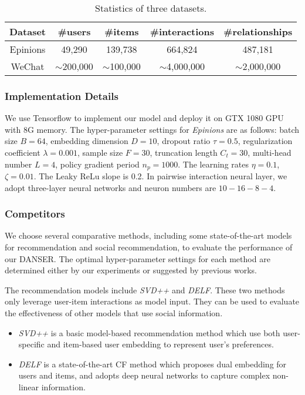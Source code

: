 \documentclass[sigconf]{acmart}
\begin{document}
\begin{table}[h]
\setlength{\abovecaptionskip}{-0.5pt}
\setlength{\belowcaptionskip}{-5pt}
	\centering
	\small
	\caption{Statistics of three datasets.}
    \label{table-dataset}
	\begin{tabular}{ccccc}
		\toprule
		Dataset & \#users & \#items & \#interactions &\#relationships \\
		\midrule
		Epinions &49,290  & 139,738  & 664,824 &487,181    \\
		WeChat &$\sim$200,000  &$\sim$100,000  & $\sim$4,000,000 & $\sim$2,000,000   \\
		\bottomrule
	\end{tabular}
	\vspace{-15pt}
\end{table}

\subsubsection{Implementation Details}

We use Tensorflow to implement our model and deploy it on GTX 1080 GPU with 8G memory. The hyper-parameter settings for \emph{Epinions} are as follows: batch size $B=64$, embedding dimension $D=10$, dropout ratio $\tau=0.5$, regularization coefficient $\lambda=0.001$, sample size $F=30$, truncation length $C_t=30$, multi-head number $L=4$, policy gradient period $n_p=1000$. The learning rates $\eta=0.1$, $\zeta=0.01$. The Leaky ReLu slope is 0.2. In pairwise interaction neural layer, we adopt three-layer neural networks and neuron numbers are $10-16-8-4$.

\subsubsection{Competitors}

We choose several comparative methods, including some state-of-the-art models for recommendation and social recommendation, to evaluate the performance of our DANSER. The optimal hyper-parameter settings for each method are determined either by our experiments or
suggested by previous works.

The recommendation models include \emph{SVD++}\cite{SVD++} and \emph{DELF}\cite{DELF}. These two methods only leverage user-item interactions as model input. They can be used to evaluate the effectiveness of other models that use social information. 
\begin{itemize}
    \item \emph{SVD++} \cite{SVD++} is a basic model-based recommendation method which use both user-specific and item-based user embedding to represent user's preferences.
    \item \emph{DELF} \cite{DELF} is a state-of-the-art CF method which proposes dual embedding for users and items, and adopts deep neural networks to capture complex non-linear information.
\end{itemize}
 
\end{document}
